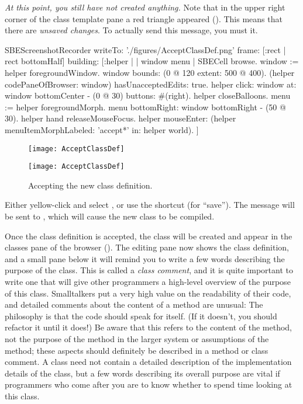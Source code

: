 \documentclass[a4paper,10pt,twoside]{book}
\begin{document}
\emph{At this point, you still have not created anything.}
Note that in the upper right corner of the class template pane a red triangle appeared ().
This means that there are \emph{unsaved changes}.
To actually send this message, you must  it.

\begin{ExecuteSmalltalkScript}
SBEScreenshotRecorder writeTo: './figures/AcceptClassDef.png' frame: [:rect | rect bottomHalf] building: [:helper |
	| window menu |
	SBECell browse.
	window := helper foregroundWindow.
	window bounds: (0 @ 120 extent: 500 @ 400).
	(helper codePaneOfBrowser: window) hasUnacceptedEdits: true.
	helper click: window at: window bottomCenter - (0 @ 30) buttons: #(right).
	helper closeBalloons.
	menu := helper foregroundMorph.
	menu bottomRight: window bottomRight - (50 @ 30).
	helper hand releaseMouseFocus.
	helper mouseEnter: (helper menuItemMorphLabeled: 'accept*' in: helper world).
]
\end{ExecuteSmalltalkScript}
\begin{figure}[h!t]
\ifluluelse
	{\centerline {\texttt{[image: AcceptClassDef]}}}
	{\centerline {\texttt{[image: AcceptClassDef]}}}
\caption{Accepting the new class definition.
\label{fig:acceptClassDef}}
\end{figure}

Either yellow-click and select , or use the shortcut  (for ``save'').
The message will be sent to , which will cause the new class to be compiled.

Once the class definition is accepted, the class will be created and appear in the classes pane of the browser ().
The editing pane now shows the class definition, and a small pane below it will remind you to write a few words describing the purpose of the class.
This is called a \emph{class comment}, and it is quite important to write one that will give other programmers a high-level overview of the purpose of this class.
Smalltalkers put a very high value on the readability of their code, and detailed comments about the content of a method are unusual:
The philosophy is that the code should speak for itself.
(If it doesn't, you should refactor it until it does!)
Be aware that this refers to the content of the method, not the purpose of the method in the larger system or assumptions of the method; these aspects should definitely be described in a method or class comment.
A class  need not contain a detailed description of the implementation details of the class, but a few words describing its overall purpose are vital if programmers who come after you are to know whether to spend time looking at this class.
\end{document}
